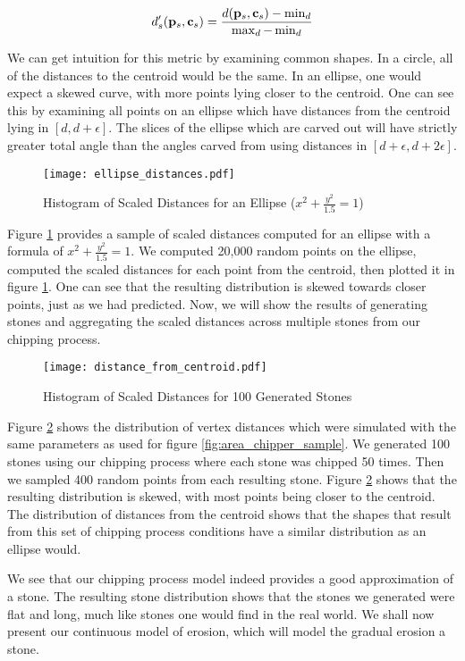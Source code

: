 \begin{eqnarray}
  d'_s(\mathbf{p}_s, \mathbf{c}_s) = \frac{d(\mathbf{p}_s, \mathbf{c}_s) - \min_d}{ \max_d - \min_d }
\end{eqnarray}

We can get intuition for this metric by examining common shapes. In a circle, all of the distances to the centroid would be the same. In an ellipse, one would expect a skewed curve, with more points lying closer to the centroid. One can see this by examining all points on an ellipse which have distances from the centroid lying in $[d, d + \epsilon]$. The slices of the ellipse which are carved out will have strictly greater total angle than the angles carved from using distances in $[d + \epsilon, d + 2 \epsilon]$.

\begin{figure}
  \begin{center}
    \texttt{[image: ellipse\_distances.pdf]}
  \end{center}
  \caption{Histogram of Scaled Distances for an Ellipse ($x^2 + \frac{y^2}{1.5} = 1$) \label{fig:ellipse_distances}}
\end{figure}

Figure \ref{fig:ellipse_distances} provides a sample of scaled distances computed for an ellipse with a formula of $x^2 + \frac{y^2}{1.5} = 1$. We computed 20,000 random points on the ellipse, computed the scaled distances for each point from the centroid, then plotted it in figure \ref{fig:ellipse_distances}. One can see that the resulting distribution is skewed towards closer points, just as we had predicted. Now, we will show the results of generating stones and aggregating the scaled distances across multiple stones from our chipping process.

\begin{figure}
  \begin{center}
    \texttt{[image: distance\_from\_centroid.pdf]}
  \end{center}
  \caption{Histogram of Scaled Distances for 100 Generated Stones \label{fig:distance_from_centroid}}
\end{figure}

Figure \ref{fig:distance_from_centroid} shows the distribution of vertex distances which were simulated with the same parameters as used for figure \ref{fig:area_chipper_sample}. We generated 100 stones using our chipping process where each stone was chipped 50 times. Then we sampled 400 random points from each resulting stone. Figure \ref{fig:distance_from_centroid} shows that the resulting distribution is skewed, with most points being closer to the centroid. The distribution of distances from the centroid shows that the shapes that result from this set of chipping process conditions have a similar distribution as an ellipse would.

We see that our chipping process model indeed provides a good approximation of a stone. The resulting stone distribution shows that the stones we generated were flat and long, much like stones one would find in the real world. We shall now present our continuous model of erosion, which will model the gradual erosion a stone.
